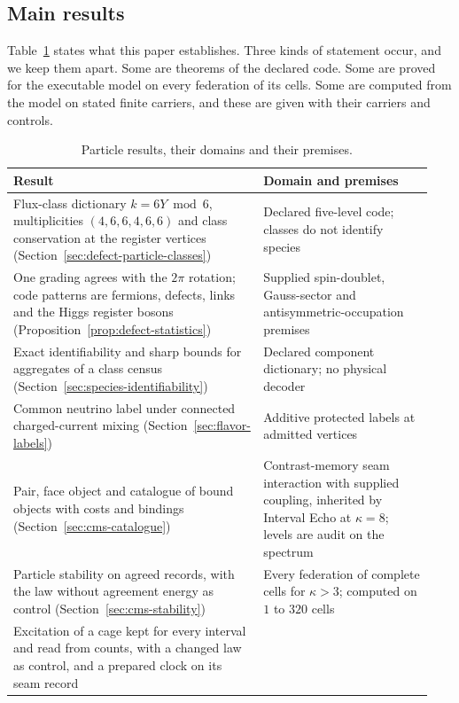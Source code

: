 \documentclass[11pt]{article}
\begin{document}
\subsection{Main results}

Table~\ref{tab:main-results} states what this paper establishes. Three kinds of
statement occur, and we keep them apart. Some are theorems of the declared code.
Some are proved for the executable model on every federation of its cells. Some
are computed from the model on stated finite carriers, and these are given with
their carriers and controls.

\begin{table}[htbp]
\centering\small
\caption{Particle results, their domains and their premises.}
\label{tab:main-results}
\begin{tabular}{@{}>{\raggedright\arraybackslash}p{0.56\linewidth}>{\raggedright\arraybackslash}p{0.38\linewidth}@{}}
\toprule
\textbf{Result} & \textbf{Domain and premises}\\
\midrule
Flux-class dictionary $k=6Y\bmod6$, multiplicities $(4,6,6,4,6,6)$ and class
conservation at the register vertices (Section~\ref{sec:defect-particle-classes}) &
Declared five-level code; classes do not identify species\\
One grading agrees with the $2\pi$ rotation; code patterns are fermions, defects,
links and the Higgs register bosons (Proposition~\ref{prop:defect-statistics}) &
Supplied spin-doublet, Gauss-sector and antisymmetric-occupation premises\\
Exact identifiability and sharp bounds for aggregates of a class census
(Section~\ref{sec:species-identifiability}) &
Declared component dictionary; no physical decoder\\
Common neutrino label under connected charged-current mixing
(Section~\ref{sec:flavor-labels}) &
Additive protected labels at admitted vertices\\
Pair, face object and catalogue of bound objects with costs and bindings
(Section~\ref{sec:cms-catalogue}) &
Contrast-memory seam interaction with supplied coupling, inherited by Interval
Echo at $\kappa=8$; levels are audit on the spectrum\\
Particle stability on agreed records, with the law without agreement energy as
control (Section~\ref{sec:cms-stability}) &
Every federation of complete cells for $\kappa>3$; computed on $1$ to $320$ cells\\
Excitation of a cage kept for every interval and read from counts, with a
changed law as control, and a prepared clock on its seam record

\end{tabular}
\end{table}
\end{document}
